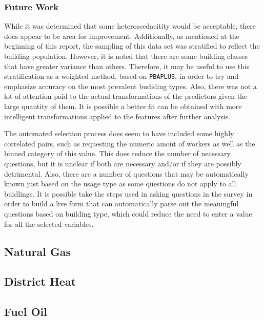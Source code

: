 \subsubsection{Future Work}
While it was determined that some heteroscedacitity would be acceptable, there does appear to be area for improvement.  Additionally, as mentioned at the beginning of this report, the sampling of this data set was stratified to reflect the building population.  However, it is noted that there are some building classes that have greater variance than others.  Therefore, it may be useful to use this stratification as a weighted method, based on \lstinline{PBAPLUS}, in order to try and emphasize accuracy on the most prevalent budiding types. Also, there was not a lot of attention paid to the actual transformations of the predictors given the large quantity of them.  It is possible a better fit can be obtained with more intelligent transformations applied to the features after further analysis.

The automated selection process does seem to have included some highly correlated pairs, such as requesting the numeric amont of workers as well as the binned category of this value.  This does reduce the number of necessary questions, but it is unclear if both are necessary and/or if they are possibly detrimental.  Also, there are a number of questions that may be automatically known just based on the usage type as some questions do not apply to all buidlings.  It is possible take the steps used in asking questions in the survey in order to build a live form that can automatically parse out the meaningful questions based on building type, which could reduce the need to enter a value for all the selected variables.

\FloatBarrier
\newpage
\subsection{Natural Gas}

\FloatBarrier
\newpage
\subsection{District Heat}

\FloatBarrier
\newpage
\subsection{Fuel Oil}